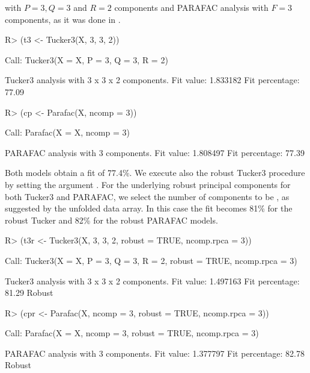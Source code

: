 \documentclass[article,shortnames, nojss]{jss}
\begin{document}
with $P=3, Q=3$ and $R=2$ components and PARAFAC analysis with $F=3$ components,
as it was done in \citet{kroonenberg:2008}.
\begin{Schunk}
\begin{Sinput}
R> (t3 <- Tucker3(X, 3, 3, 2))
\end{Sinput}
\begin{Soutput}
Call:
Tucker3(X = X, P = 3, Q = 3, R = 2)


Tucker3 analysis with  3 x 3 x 2  components.
Fit value: 1.833182 
Fit percentage: 77.09 %
\end{Soutput}
\begin{Sinput}
R> (cp <- Parafac(X, ncomp = 3))
\end{Sinput}
\begin{Soutput}
Call:
Parafac(X = X, ncomp = 3)


PARAFAC analysis with  3  components.
Fit value: 1.808497 
Fit percentage: 77.39 %
\end{Soutput}
\end{Schunk}
Both models obtain a fit of 77.4\%. We execute also the robust Tucker3 procedure
by setting the argument . For the underlying robust principal
components for both Tucker3 and PARAFAC, we select the number of components
to be , as suggested by the unfolded data array.
In this case the fit becomes 81\% for the robust Tucker and 82\% for
the robust PARAFAC models.
\begin{Schunk}
\begin{Sinput}
R> (t3r <- Tucker3(X, 3, 3, 2, robust = TRUE, ncomp.rpca = 3))
\end{Sinput}
\begin{Soutput}
Call:
Tucker3(X = X, P = 3, Q = 3, R = 2, robust = TRUE, ncomp.rpca = 3)


Tucker3 analysis with  3 x 3 x 2  components.
Fit value: 1.497163 
Fit percentage: 81.29 %
Robust
\end{Soutput}
\begin{Sinput}
R> (cpr <- Parafac(X, ncomp = 3, robust = TRUE, ncomp.rpca = 3))
\end{Sinput}
\begin{Soutput}
Call:
Parafac(X = X, ncomp = 3, robust = TRUE, ncomp.rpca = 3)


PARAFAC analysis with  3  components.
Fit value: 1.377797 
Fit percentage: 82.78 %
Robust
\end{Soutput}
\end{Schunk}
\end{document}
